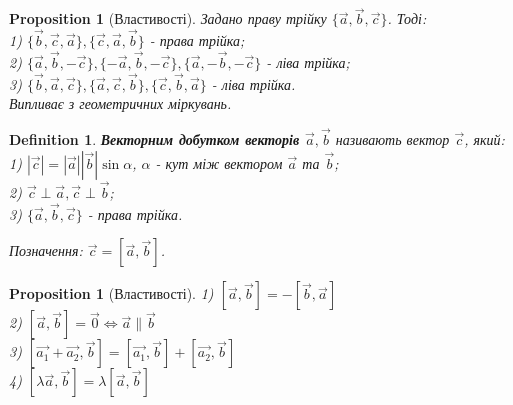 \documentclass[a4paper, 10pt]{extarticle}
\theoremstyle{theoremdd}
\theoremstyle{theoremdd}
\newtheorem{definition}[theorem]{Definition}
\theoremstyle{theoremdd}
\theoremstyle{theoremdd}
\theoremstyle{theoremdd}
\newtheorem{proposition}[theorem]{Proposition}
\theoremstyle{theoremdd}
\theoremstyle{theoremdd}
\theoremstyle{theoremdd}
\begin{document}
\begin{proposition}[Властивості]
	Задано праву трійку $\{\vec{a}, \vec{b}, \vec{c}\}$. Тоді:\\
	1) $\{\vec{b}, \vec{c}, \vec{a}\}, \{\vec{c}, \vec{a}, \vec{b}\}$ - права трійка;\\
	2) $\{\vec{a}, \vec{b}, -\vec{c}\}, \{-\vec{a}, \vec{b}, -\vec{c}\}, \{\vec{a}, -\vec{b}, -\vec{c}\}$ - ліва трійка;\\
	3) $\{\vec{b}, \vec{a}, \vec{c}\}, \{\vec{a}, \vec{c}, \vec{b}\}, \{\vec{c}, \vec{b}, \vec{a}\}$ - ліва трійка.\\
	\textit{Випливає з геометричних міркувань.}
\end{proposition}

\begin{definition}
	\textbf{Векторним добутком векторів $\vec{a}, \vec{b}$} називають вектор $\vec{c}$, який:\\
	1) $|\vec{c}| = |\vec{a}| |\vec{b}| \sin \alpha$, $\alpha$ - кут між вектором $\vec{a}$ та $\vec{b}$;\\
	2) $\vec{c} \perp \vec{a}, \vec{c} \perp \vec{b}$;\\
	3) $\{\vec{a}, \vec{b}, \vec{c}\}$ - права трійка.
\begin{figure}[H]
\centering
{}
\end{figure}
Позначення: $\vec{c} = [\vec{a}, \vec{b}]$.
\end{definition}

\begin{proposition}[Властивості]
1) $[\vec{a}, \vec{b}] = -[\vec{b}, \vec{a}]$\\
2) $[\vec{a}, \vec{b}] = \vec{0} \iff \vec{a} \parallel \vec{b}$\\
3) $[\vec{a_1} + \vec{a_2}, \vec{b}] = [\vec{a_1}, \vec{b}] + [\vec{a_2}, \vec{b}]$\\
4) $[\lambda \vec{a}, \vec{b}] = \lambda [\vec{a}, \vec{b}]$
\end{proposition}
\end{document}
